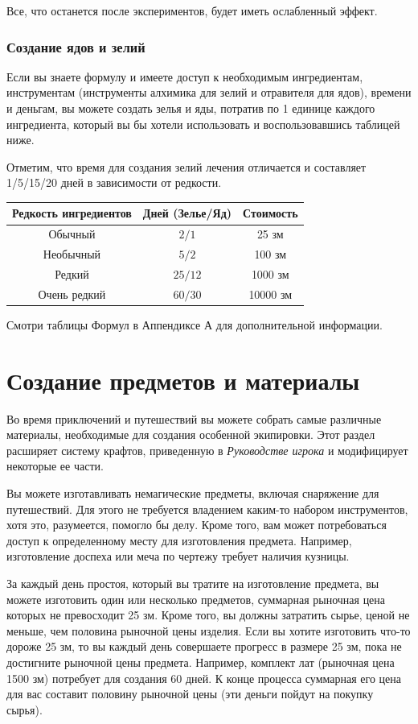 \documentclass[a4paper, 9pt, twocolumn]{book}
\begin{document}
	Все, что останется после экспериментов, будет иметь ослабленный эффект.
	
	\subsection{Создание ядов и зелий}
	
	Если вы знаете формулу и имеете доступ к необходимым ингредиентам, инструментам (инструменты алхимика для зелий и отравителя для ядов), времени и деньгам, вы можете создать зелья и яды, потратив по 1 единице каждого ингредиента, который вы бы хотели использовать и воспользовавшись таблицей ниже.
	
	Отметим, что время для создания зелий лечения отличается и составляет 1/5/15/20 дней в зависимости от редкости.
	
	\begin{tabular}{|c|c|c|}
		\hline
		\textbf{Редкость ингредиентов} & \textbf{Дней (Зелье/Яд)} & \textbf{Стоимость} \\
		\hline
		Обычный & $2/1$ & 25 зм \\
		\hline
		Необычный & $5/2$ & 100 зм \\
		\hline
		Редкий & $25/12$ & 1000 зм \\
		\hline
		Очень редкий & $60/30$ & 10000 зм \\
		\hline
	\end{tabular}
	
	Смотри таблицы Формул в Аппендиксе А для дополнительной информации.
	
	\chapter{Создание предметов и материалы}
	
	Во время приключений и путешествий вы можете собрать самые различные материалы, необходимые для создания особенной экипировки. Этот раздел расширяет систему крафтов, приведенную в \textit{Руководстве игрока} и модифицирует некоторые ее части.
	
	Вы можете изготавливать немагические предметы, включая снаряжение для путешествий. Для этого не требуется владением каким-то набором инструментов, хотя это, разумеется, помогло бы делу. Кроме того, вам может потребоваться доступ к определенному месту для изготовления предмета. Например, изготовление доспеха или меча по чертежу требует наличия кузницы.
	
	За каждый день простоя, который вы тратите на изготовление предмета, вы можете изготовить один или несколько предметов, суммарная рыночная цена которых не превосходит 25 зм. Кроме того, вы должны затратить сырье, ценой не меньше, чем половина рыночной цены изделия. Если вы хотите изготовить что-то дороже 25 зм, то вы каждый день совершаете прогресс в размере 25 зм, пока не достигните рыночной цены предмета. Например, комплект лат (рыночная цена 1500 зм) потребует для создания 60 дней. К конце процесса суммарная его цена для вас составит половину рыночной цены (эти деньги пойдут на покупку сырья).
	
\end{document}
